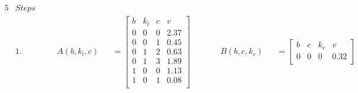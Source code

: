 \begin{figure}[H]
    \begin{alignat*}{5}
         & Steps \quad &              &                &                                                                                      &                                                                                                       &  &  &  & \\
         & 1.          &              & A(b, k_l, c)   &                                                                                      & = \begin{bmatrix}
                                                                                                                                                      b & k_l & c & v    \\
                                                                                                                                                      0 & 0   & 0 & 2.37 \\
                                                                                                                                                      0 & 0   & 1 & 0.45 \\
                                                                                                                                                      0 & 1   & 2 & 0.63 \\
                                                                                                                                                      0 & 1   & 3 & 1.89 \\
                                                                                                                                                      1 & 0   & 0 & 1.13 \\
                                                                                                                                                      1 & 0   & 1 & 0.08 \\
                                                                                                                                                  \end{bmatrix} \qquad
         &             & B(b, c, k_r) &                & = \begin{bmatrix}
                                                               b & c & k_r & v    \\
                                                               0 & 0 & 0   & 0.32 \\

\end{bmatrix}
\end{alignat*}
\end{figure}
